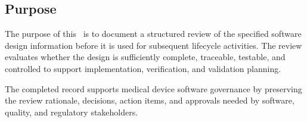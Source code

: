 \subsection{Purpose}
The purpose of this \stdDesignReview\ is to document a structured review of the
specified software design information before it is used for subsequent lifecycle
activities.  The review evaluates whether the design is sufficiently complete,
traceable, testable, and controlled to support implementation, verification, and
validation planning.

\tlcVspace

The completed record supports medical device software governance by preserving
the review rationale, decisions, action items, and approvals needed by software,
quality, and regulatory stakeholders.
